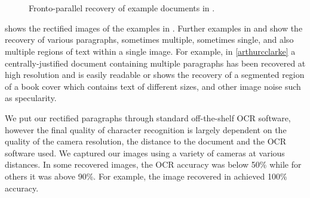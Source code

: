 \begin{figure}[t]
\centering
\begin{center}
\hspace{2mm}\\
\\
\end{center}
\caption{Fronto-parallel recovery of example documents in .}
\label{pprecover}
\end{figure}

 shows the rectified images of the examples in
. Further examples in  and 
 show the recovery of various paragraphs, sometimes
multiple, sometimes single, and also multiple regions of text within a single image. 
For example, in \ref{arthurcclarke} a centrally-justified document containing
multiple paragraphs has been recovered at high resolution and is easily readable
or  shows the recovery of a segmented region of a book cover
which contains text of different sizes, and other image noise such as specularity.

We put our rectified paragraphs through standard off-the-shelf OCR software,
however the final quality of character recognition is largely dependent on the quality of
the camera resolution, the distance to the document and the OCR software used. 
We captured our images using a variety of cameras at various distances. 
In some recovered images, the OCR accuracy was below 50\%
while for others it was above 90\%.  For example, the image recovered in
 achieved 100\% accuracy.

